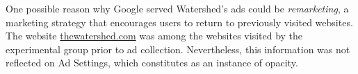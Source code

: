 \documentclass[10pt, onecolumn]{report}
\begin{document}

One possible reason why Google served Watershed's ads could be 
\emph{remarketing}, a marketing strategy that encourages users to 
return to previously visited websites. The website \url{thewatershed.com} was among 
the websites visited by the experimental group prior to ad collection. 
Nevertheless, this information was not reflected on Ad Settings, which constitutes
as an instance of opacity. 
\end{document}
